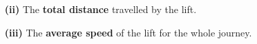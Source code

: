 \documentclass[A4,12pt]{article}
\begin{document}
\begin{enumerate}[label=\bfseries (\arabic*)]
\begin{itemize}
\begin{itemize}
        \item[\bf (ii)] The \textbf{total distance} travelled by the lift.
        \item[\bf (iii)] The \textbf{average speed} of the lift for the whole journey.
    \end{itemize}
\end{itemize}




















\end{enumerate}
\end{document}
